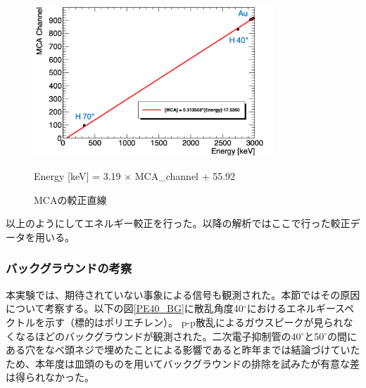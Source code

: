 \documentclass[a4paper,11pt,dvipdfmx]{jsarticle}
\begin{document}
\begin{figure}[H]
\centering
\includegraphics[width=90mm]{picture/cali/mca_cali.png}
\caption{MCAの較正直線}
\label{mca_cali}
Energy [keV] = 3.19 $\times$ MCA\_channel + 55.92
\end{figure}

以上のようにしてエネルギー較正を行った。以降の解析ではここで行った較正データを用いる。

\vspace*{5mm}

\subsubsection{バックグラウンドの考察}
本実験では、期待されていない事象による信号も観測された。本節ではその原因について考察する。以下の図\ref{PE40_BG}に散乱角度40$^\circ$におけるエネルギースペクトルを示す（標的はポリエチレン）。
p-p散乱によるガウスピークが見られなくなるほどのバックグラウンドが観測された。二次電子抑制管の40$^\circ$と50$^\circ$の間にある穴をなべ頭ネジで埋めたことによる影響であると昨年までは結論づけていたため、本年度は皿頭のものを用いてバックグラウンドの排除を試みたが有意な差は得られなかった。
\end{document}
